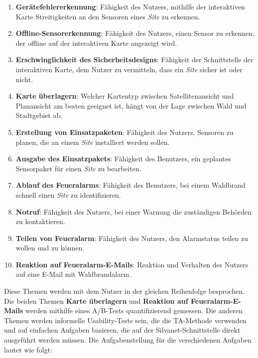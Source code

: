 \begin{enumerate}
  \item \textbf{Gerätefehlererkennung}: Fähigkeit des Nutzers, mithilfe der interaktiven Karte Streitigkeiten an den Sensoren eines \textit{Site} zu erkennen.
  \item \textbf{Offline-Sensorerkennung}: Fähigkeit des Nutzers, einen Sensor zu erkennen, der offline auf der interaktiven Karte angezeigt wird.
  \item \textbf{Erschwinglichkeit des Sicherheitsdesigns}: Fähigkeit der Schnittstelle der interaktiven Karte, dem Nutzer zu vermitteln, dass ein \textit{Site} sicher ist oder nicht.
  \item \textbf{Karte überlagern}: Welcher Kartentyp zwischen Satellitenansicht und Planansicht am besten geeignet ist, hängt von der Lage zwischen Wald und Stadtgebiet ab.
  \item \textbf{Erstellung von Einsatzpaketen}: Fähigkeit des Nutzers, Sensoren zu planen, die an einem \textit{Site} installiert werden sollen.
  \item \textbf{Ausgabe des Einsatzpakets}: Fähigkeit des Benutzers, ein geplantes Sensorpaket für einen \textit{Site} zu bearbeiten.
  \item \textbf{Ablauf des Feueralarms}: Fähigkeit des Benutzers, bei einem Waldbrand schnell einen \textit{Site} zu identifizieren.
  \item \textbf{Notruf}: Fähigkeit des Nutzers, bei einer Warnung die zuständigen Behörden zu kontaktieren.
  \item \textbf{Teilen von Feueralarm}: Fähigkeit des Nutzers, den Alarmstatus teilen zu wollen und zu können.
  \item \textbf{Reaktion auf Feueralarm-E-Mails}: Reaktion und Verhalten des Nutzers auf eine E-Mail mit Waldbrandalarm.
\end{enumerate}

Diese Themen werden mit dem Nutzer in der gleichen Reihenfolge besprochen.
Die beiden Themen \textbf{Karte überlagern} und \textbf{Reaktion auf Feueralarm-E-Mails} werden mithilfe eines A/B-Tests quantifizierend gemessen.
Die anderen Themen werden informelle Usability-Tests sein, die die \ac{TA}-Methode verwenden und auf einfachen Aufgaben basieren, die auf der Silvanet-Schnittstelle direkt ausgeführt werden müssen.
Die Aufgabenstellung für die verschiedenen Aufgaben lautet wie folgt:

